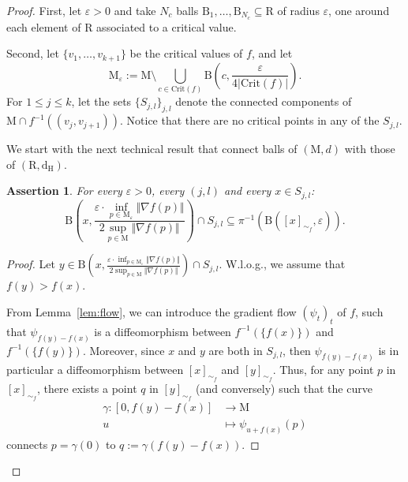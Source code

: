 \documentclass[pdflatex,sn-mathphys-ay]{sn-jnl}%
\newtheorem*{assertion*}{Assertion}
\newcommand{\reeb}{\mathrm{R}}
\newcommand{\man}{\mathrm{M}}
\newcommand{\critic}{{\mathrm {Crit}}}
\newcommand{\haus}{{\mathrm {d_H}}}
\newcommand{\ball}{{\mathrm {B}}}
\newcommand{\eps}{\varepsilon}
\newcommand{\preim}[2]{#1^{-1}(#2)}
\theoremstyle{thmstyleone}%
\begin{document}
  \begin{proof}
 First, let $\eps>0$ and  take $N_c$ balls $\ball_1,\dots,\ball_{N_c}\subseteq \reeb$ of radius $\eps$, one around each element of $\reeb$ associated to a critical value. %

 Second, let $\{v_1,\dots,v_{k+1}\}$ be the critical values of $f$, and let
 $$\man_\eps :=\man\setminus \bigcup_{c \in \critic(f)}\ball\left(c,\frac{\eps}{4\left|\critic(f)\right|}\right).$$
 For $1\leq j\leq k$, let the sets $\{S_{j,l}\}_{j,l}$ 
 denote the connected components of $\man\cap \preim{f}{(v_j,v_{j+1})}$. Notice that there are no critical points in any of the $S_{j,l}$.
 
 We start with the next technical result that connect balls of $(\man,d)$ with those of $(\reeb,\haus)$.
 
 \begin{assertion*}
 For every $\eps>0$, every $(j,l)$ and every $x\in S_{j,l}$:
 $$\ball\left(x,\frac{\eps\cdot \inf_{p\in\man_\eps}\Vert\nabla f(p)\Vert}{2\sup_{p\in\man}\Vert\nabla f(p)\Vert}\right)\cap S_{j,l}\subseteq \preim{\pi}{\ball\left([x]_{\sim_f},\eps\right)}.$$
 \end{assertion*}
 
 \begin{proof}
 Let $y\in \ball\left(x,\frac{\eps\cdot \inf_{p\in\man_\eps}\Vert\nabla f(p)\Vert}{2\sup_{p\in\man}\Vert\nabla f(p)\Vert}\right)\cap S_{j,l}$. W.l.o.g., we assume that $f(y)>f(x)$.
 
From Lemma~\ref{lem:flow}, we can introduce the gradient flow $(\psi_t)_t$ %
of $f$, such that  $\psi_{f(y)-f(x)}$  is a diffeomorphism between $\preim{f}{\{f(x)\}}$ and $\preim{f}{\{f(y)\}}$. Moreover, since $x$ and $y$ are both in $S_{j,l}$, then $\psi_{f(y)-f(x)}$ is in particular a diffeomorphism between $[x]_{\sim_f}$ and $[y]_{\sim_f}$. Thus, for any point $p$ in $[x]_{\sim_f}$, there exists a point $q$ in $[y]_{\sim_f}$ (and conversely) such that the curve
 \begin{align*}
 \gamma\colon[0,f(y)-f(x)]&\longrightarrow \man\\
 u&\longmapsto\psi_{u+f(x)}(p)
 \end{align*}
connects $p = \gamma(0)$ to $q := \gamma(f(y)-f(x))$.


\end{proof}
\end{proof}
\end{document}
